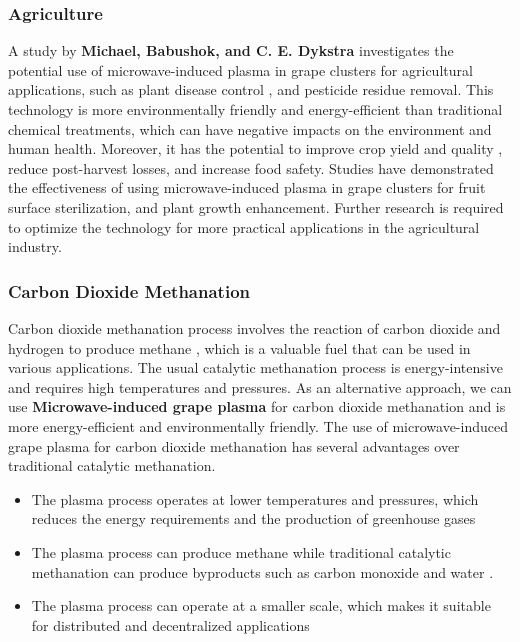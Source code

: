 \documentclass{article}
\begin{document}
\subsubsection{\Large Agriculture}

\large A study by \textbf{Michael, Babushok, and C. E. Dykstra} investigates the potential use of microwave-induced plasma in grape clusters for agricultural applications, such as plant disease control \cite{GDS}, \cite{PGTD} and pesticide residue removal. 
This technology is more environmentally friendly and energy-efficient than traditional chemical treatments, which can have negative impacts on the environment and human health. Moreover, it has the potential to improve crop yield and quality \cite{MIP}, reduce post-harvest losses, and increase food safety. 
Studies have demonstrated the effectiveness of using microwave-induced plasma in grape clusters for fruit surface sterilization\cite{SSGB}, and plant growth enhancement. Further research is required to optimize the technology for more practical applications in the agricultural industry.

\subsubsection{\Large Carbon Dioxide Methanation}
Carbon dioxide methanation process involves the reaction of carbon dioxide  and hydrogen  to produce methane , which is a valuable fuel that can be used in various applications. The usual catalytic methanation process is energy-intensive and requires high temperatures and pressures. As an alternative approach, we can use \textbf{Microwave-induced grape plasma} for carbon dioxide methanation and is more energy-efficient and environmentally friendly. 
The use of microwave-induced grape plasma for carbon dioxide methanation has several advantages over traditional catalytic methanation. 
\begin{itemize}
    \item \normalsize The plasma process operates at lower temperatures and pressures, which reduces the energy requirements and the production of greenhouse gases
    \item \normalsize The plasma process can produce methane  while traditional catalytic methanation can produce byproducts such as carbon monoxide  and water  .
    \item \normalsize The plasma process can operate at a smaller scale, which makes it suitable for distributed and decentralized applications
\end{itemize}
\end{document}
